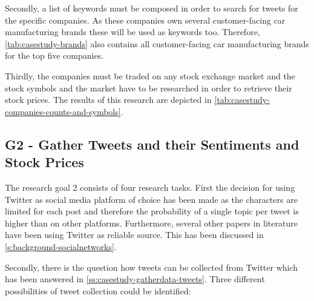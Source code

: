 Secondly, a list of keywords must be composed in order to search for tweets for the specific companies.
As these companies own several customer-facing car manufacturing brands these will be used as keywords too.
Therefore, \cref{tab:casestudy-brands} also contains all customer-facing car manufacturing brands for the top five companies.

Thirdly, the companies must be traded on any stock exchange market and the stock symbols and the market have to be researched in order to retrieve their stock prices.
The results of this research are depicted in \cref{tab:casestudy-companies-counts-and-symbols}.

\subsection{G2 - Gather Tweets and their Sentiments and Stock Prices}
\label{ss:conclusion-summary-g2}


The research goal 2 consists of four research tasks.
First the decision for using Twitter as social media platform of choice has been made as the characters are limited for each post and therefore the probability of a single topic per tweet is higher than on other platforms.
Furthermore, several other papers in literature have been using Twitter as reliable source.
This has been discussed in \cref{s:background-socialnetworks}.

Secondly, there is the question how tweets can be collected from Twitter which has been answered in \cref{ss:casestudy-gatherdata-tweets}.
Three different possibilities of tweet collection could be identified:

